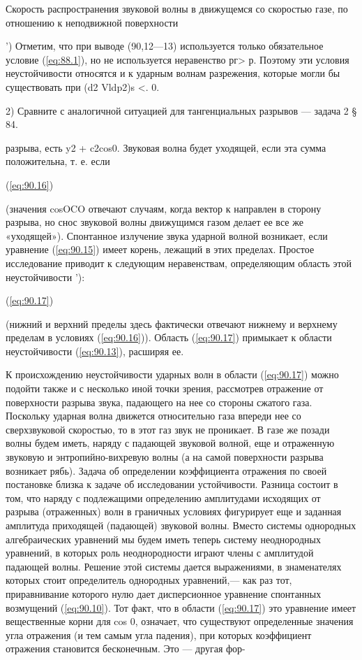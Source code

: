 Скорость распространения звуковой волны в движущемся со скоростью газе, по
отношению к неподвижной поверхности

') Отметим, что при выводе (90,12—13) используется только обязательное условие
(\ref{eq:88.1}), но не используется неравенство рг> р. Поэтому эти условия
неустойчивости относятся и к ударным волнам разрежения, которые могли бы
существовать при (d2 Vldp2)s <. 0.

2) Сравните с аналогичной ситуацией для тангенциальных разрывов — задача 2 §
84.


разрыва, есть y2 + c2cos0. Звуковая волна будет уходящей, если эта сумма
положительна, т. е. если

(\ref{eq:90.16})

(значения cosOCO отвечают случаям, когда вектор к направлен в сторону разрыва,
но снос звуковой волны движущимся газом делает ее все же «уходящей»).
Спонтанное излучение звука ударной волной возникает, если уравнение
(\ref{eq:90.15}) имеет корень, лежащий в этих пределах. Простое исследование
приводит к следующим неравенствам, определяющим область этой неустойчивости '):


(\ref{eq:90.17})


(нижний и верхний пределы здесь фактически отвечают нижнему и верхнему пределам
в условиях (\ref{eq:90.16})). Область (\ref{eq:90.17}) примыкает к области
неустойчивости (\ref{eq:90.13}), расширяя ее.

К происхождению неустойчивости ударных волн в области (\ref{eq:90.17}) можно
подойти также и с несколько иной точки зрения, рассмотрев отражение от
поверхности разрыва звука, падающего на нее со стороны сжатого газа. Поскольку
ударная волна движется относительно газа впереди нее со сверхзвуковой
скоростью, то в этот газ звук не проникает. В газе же позади волны будем иметь,
наряду с падающей звуковой волной, еще и отраженную звуковую и
энтропийно-вихревую волны (а на самой поверхности разрыва возникает рябь).
Задача об определении коэффициента отражения по своей постановке близка к
задаче об исследовании устойчивости. Разница состоит в том, что наряду с
подлежащими определению амплитудами исходящих от разрыва (отраженных) волн в
граничных условиях фигурирует еще и заданная амплитуда приходящей (падающей)
звуковой волны.  Вместо системы однородных алгебраических уравнений мы будем
иметь теперь систему неоднородных уравнений, в которых роль неоднородности
играют члены с амплитудой падающей волны. Решение этой системы дается
выражениями, в знаменателях которых стоит определитель однородных уравнений,—
как раз тот, приравнивание которого нулю дает дисперсионное уравнение
спонтанных возмущений (\ref{eq:90.10}). Тот факт, что в области
(\ref{eq:90.17}) это уравнение имеет вещественные корни для cos 0, означает,
что существуют определенные значения угла отражения (и тем самым угла падения),
при которых коэффициент отражения становится бесконечным.  Это — другая фор-

